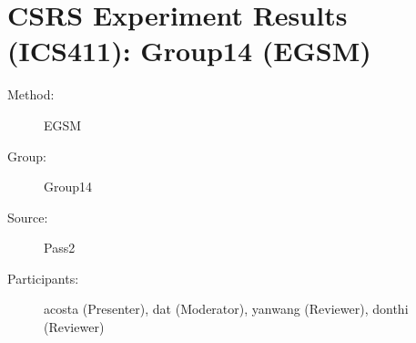 \chapter {CSRS Experiment Results (ICS411): Group14 (EGSM)}
\small

\begin{description}
\item [Method:] EGSM
\item [Group:] Group14
\item [Source:] Pass2
\item [Participants:] acosta (Presenter), dat (Moderator), yanwang (Reviewer), donthi (Reviewer)
\end{description}
